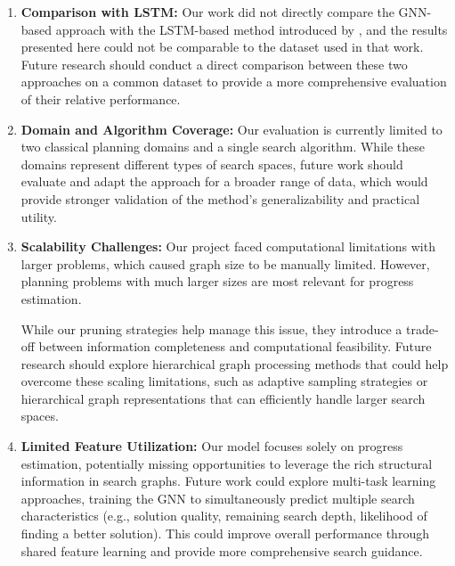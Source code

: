 \documentclass[letterpaper]{article}
\begin{document}
\begin{enumerate}
    \item \textbf{Comparison with LSTM:} Our work did not directly compare the GNN-based approach with the LSTM-based method introduced by \citet{sudry2022learning}, and the results presented here could not be comparable to the dataset used in that work. Future research should conduct a direct comparison between these two approaches on a common dataset to provide a more comprehensive evaluation of their relative performance.

    \item \textbf{Domain and Algorithm Coverage:} Our evaluation is currently limited to two classical planning domains and a single search algorithm. While these domains represent different types of search spaces, future work should evaluate and adapt the approach for a broader range of data, which would provide stronger validation of the method's generalizability and practical utility.

    \item \textbf{Scalability Challenges:} Our project faced computational limitations with larger problems, which caused graph size to be manually limited. However, planning problems with much larger sizes are most relevant for progress estimation.

    While our pruning strategies help manage this issue, they introduce a trade-off between information completeness and computational feasibility. Future research should explore hierarchical graph processing methods that could help overcome these scaling limitations, such as adaptive sampling strategies or hierarchical graph representations that can efficiently handle larger search spaces.

    \item \textbf{Limited Feature Utilization:} Our model focuses solely on progress estimation, potentially missing opportunities to leverage the rich structural information in search graphs. Future work could explore multi-task learning approaches, training the GNN to simultaneously predict multiple search characteristics (e.g., solution quality, remaining search depth, likelihood of finding a better solution). This could improve overall performance through shared feature learning and provide more comprehensive search guidance.
\end{enumerate}


\onecolumn
\end{document}
